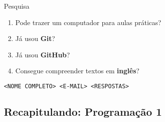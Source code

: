 \documentclass[10pt]{beamer}
\begin{document}
\begin{frame}{Pesquisa}

    \begin{enumerate}
    \item Pode trazer um computador para aulas práticas?
    \item Já usou \textbf{Git}?
    \item Já usou \textbf{GitHub}?
    \item Consegue compreender textos em \textbf{inglês}?
    \end{enumerate}

    \bigskip
    \bigskip

    \centering
    \texttt{<NOME COMPLETO> <E-MAIL> <RESPOSTAS>}
\end{frame}

\subsection{Recapitulando: Programação 1}
\end{document}
